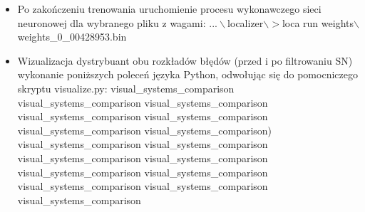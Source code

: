 \documentclass{classrep}
\begin{document}
{\begin{itemize}
            	\item {} Po zakończeniu trenowania uruchomienie procesu wykonawczego sieci neuronowej dla wybranego pliku z wagami:
			\linebreak\linebreak
			$...\backslash$localizer$\backslash >$loca run weights$\backslash$weights\_0\_00428953.bin

		\item {} Wizualizacja dystrybuant obu rozkładów błędów (przed i po filtrowaniu SN) \ppauza wykonanie poniższych poleceń języka Python, odwołując się do pomocniczego skryptu visualize.py:
			\linebreak\linebreak
			visual\_systems\_comparison \linebreak
			visual\_systems\_comparison\linebreak
			visual\_systems\_comparison\linebreak
		           visual\_systems\_comparison \linebreak
			visual\_systems\_comparison \linebreak
			visual\_systems\_comparison \linebreak
			visual\_systems\_comparison) \linebreak
			visual\_systems\_comparison \linebreak
			visual\_systems\_comparison \linebreak
			visual\_systems\_comparison \linebreak
			visual\_systems\_comparison \linebreak
			visual\_systems\_comparison \linebreak
			visual\_systems\_comparison \linebreak
			visual\_systems\_comparison \linebreak
			visual\_systems\_comparison \linebreak
			visual\_systems\_comparison \linebreak
           \end{itemize} 
}
\end{document}
